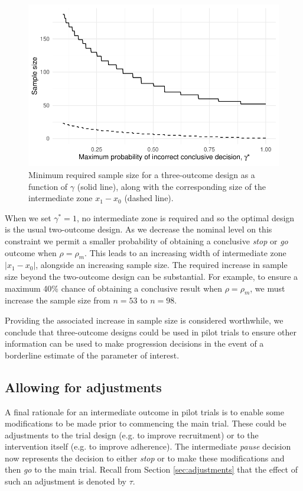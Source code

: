 \documentclass{bmcart}
\begin{document}
\begin{figure}
\centering
\includegraphics[scale=0.8]{./figures/gamma_ns}
\caption{Minimum required sample size for a three-outcome design as a function of $\gamma$ (solid line), along with the corresponding size of the intermediate zone $x_1 - x_0$ (dashed line).}
\label{fig:gamma_ns}
\end{figure}

When we set $\gamma^* = 1$, no intermediate zone is required and so the optimal design is the usual two-outcome design. As we decrease the nominal level on this constraint we permit a smaller probability of obtaining a conclusive \emph{stop} or \emph{go} outcome when $\rho = \rho_m$. This leads to an increasing width of intermediate zone $|x_1 - x_0|$, alongside an increasing sample size. The required increase in sample size beyond the two-outcome design can be substantial. For example, to ensure a maximum 40\% chance of obtaining a conclusive result when $\rho = \rho_m$, we must increase the sample size from $n = 53$ to $n = 98$. 

Providing the associated increase in sample size is considered worthwhile, we conclude that three-outcome designs could be used in pilot trials to ensure other information can be used to make progression decisions in the event of a borderline estimate of the parameter of interest.

\subsection{Allowing for adjustments}

A final rationale for an intermediate outcome in pilot trials is to enable some modifications to be made prior to commencing the main trial. These could be adjustments to the trial design (e.g. to improve recruitment) or to the intervention itself (e.g. to improve adherence). The intermediate \emph{pause} decision now represents the decision to either \emph{stop} or to make these modifications and then \emph{go} to the main trial. Recall from Section \ref{sec:adjustments} that the effect of such an adjustment is denoted by $\tau$.
\end{document}
